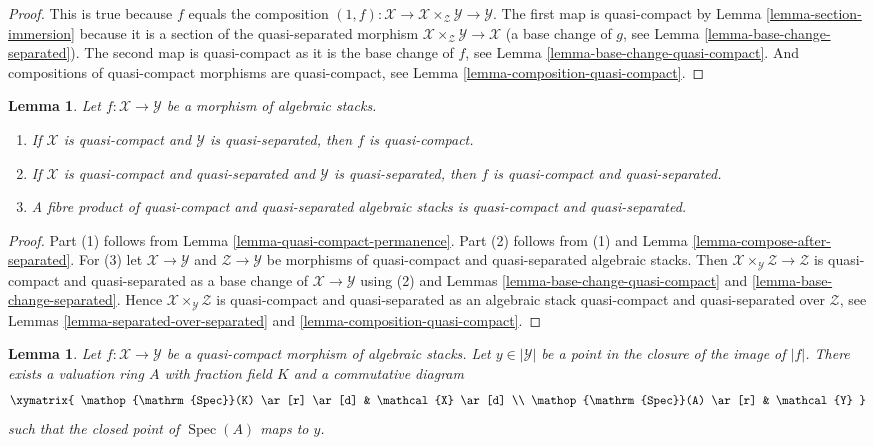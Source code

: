 \documentclass{stacks-project}
\theoremstyle{plain}
\newtheorem{lemma}[subsection]{Lemma}
\theoremstyle{definition}
\theoremstyle{remark}
\numberwithin{equation}{subsection}
\def\Spec{\mathop{\mathrm{Spec}}}
\begin{document}
\begin{proof}
This is true because $f$ equals the composition
$(1, f) : \mathcal{X} \to \mathcal{X} \times_\mathcal{Z} \mathcal{Y} \to
\mathcal{Y}$.
The first map is quasi-compact by
Lemma \ref{lemma-section-immersion}
because it is a section of the quasi-separated morphism
$\mathcal{X} \times_\mathcal{Z} \mathcal{Y} \to \mathcal{X}$
(a base change of $g$, see
Lemma \ref{lemma-base-change-separated}).
The second map is quasi-compact as it is the base change of $f$, see
Lemma \ref{lemma-base-change-quasi-compact}.
And compositions of quasi-compact
morphisms are quasi-compact, see Lemma \ref{lemma-composition-quasi-compact}.
\end{proof}

\begin{lemma}
\label{lemma-quasi-compact-quasi-separated-permanence}
Let $f : \mathcal{X} \to \mathcal{Y}$ be a morphism of algebraic stacks.
\begin{enumerate}
\item If $\mathcal{X}$ is quasi-compact and $\mathcal{Y}$ is
quasi-separated, then $f$ is quasi-compact.
\item If $\mathcal{X}$ is quasi-compact and quasi-separated and $\mathcal{Y}$
is quasi-separated, then $f$ is quasi-compact and quasi-separated.
\item A fibre product of quasi-compact and quasi-separated algebraic stacks
is quasi-compact and quasi-separated.
\end{enumerate}
\end{lemma}

\begin{proof}
Part (1) follows from
Lemma \ref{lemma-quasi-compact-permanence}.
Part (2) follows from (1) and
Lemma \ref{lemma-compose-after-separated}.
For (3) let $\mathcal{X} \to \mathcal{Y}$ and $\mathcal{Z} \to \mathcal{Y}$
be morphisms of quasi-compact and quasi-separated algebraic stacks.
Then $\mathcal{X} \times_\mathcal{Y} \mathcal{Z} \to \mathcal{Z}$
is quasi-compact and quasi-separated as a base change of
$\mathcal{X} \to \mathcal{Y}$ using (2) and
Lemmas \ref{lemma-base-change-quasi-compact} and
\ref{lemma-base-change-separated}.
Hence $\mathcal{X} \times_\mathcal{Y} \mathcal{Z}$
is quasi-compact and quasi-separated as
an algebraic stack quasi-compact and quasi-separated over
$\mathcal{Z}$, see
Lemmas \ref{lemma-separated-over-separated} and
\ref{lemma-composition-quasi-compact}.
\end{proof}

\begin{lemma}
\label{lemma-reach-points-scheme-theoretic-image}
Let $f : \mathcal{X} \to \mathcal{Y}$ be a quasi-compact morphism of
algebraic stacks. Let $y \in |\mathcal{Y}|$ be a point in the closure
of the image of $|f|$. There exists a valuation ring $A$ with
fraction field $K$ and a commutative diagram
$$
\xymatrix{
\Spec(K) \ar[r] \ar[d] & \mathcal{X} \ar[d] \\
\Spec(A) \ar[r] & \mathcal{Y}
}
$$
such that the closed point of $\Spec(A)$ maps to $y$.
\end{lemma}
\end{document}
